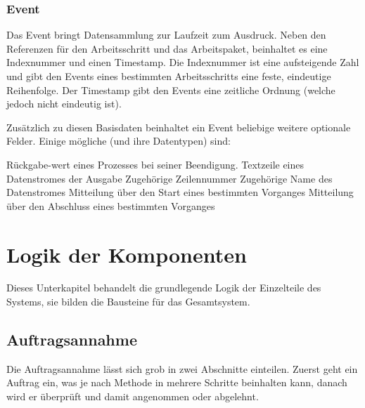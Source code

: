 

\subsubsection{Event}

Das Event bringt Datensammlung zur Laufzeit zum Ausdruck.
Neben den Referenzen für den Arbeitsschritt und das Arbeitspaket,
beinhaltet es eine Indexnummer und einen Timestamp.
Die Indexnummer ist eine aufsteigende Zahl
und gibt den Events eines bestimmten Arbeitsschritts eine feste, eindeutige Reihenfolge.
Der Timestamp gibt den Events eine zeitliche Ordnung (welche jedoch nicht eindeutig ist).


Zusätzlich zu diesen Basisdaten beinhaltet ein Event beliebige weitere optionale Felder.
Einige mögliche (und ihre Datentypen) sind:

\begin{description}
     Rückgabe-wert eines Prozesses bei seiner Beendigung.
     Textzeile eines Datenstromes der Ausgabe
     Zugehörige Zeilennummer
     Zugehörige Name des Datenstromes
     Mitteilung über den Start eines bestimmten Vorganges
     Mitteilung über den Abschluss eines bestimmten Vorganges
\end{description}




\section{Logik der Komponenten}

Dieses Unterkapitel behandelt die grundlegende Logik  der Einzelteile des Systems,
sie bilden die Bausteine für das Gesamtsystem.


\subsection{Auftragsannahme}

Die Auftragsannahme lässt sich grob in zwei Abschnitte einteilen.
Zuerst geht ein Auftrag ein, was je nach Methode in mehrere Schritte beinhalten kann,
danach wird er überprüft und damit angenommen oder abgelehnt.



